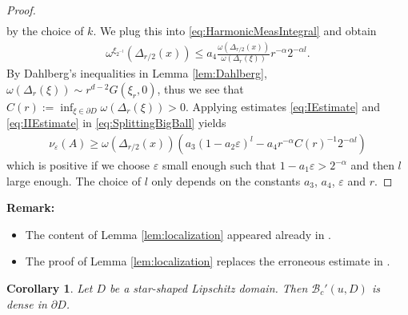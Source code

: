 \documentclass[a4paper,12pt]{article}
\newtheorem{corollary}{Corollary}[theorem]
\theoremstyle{definition}
\theoremstyle{definition}
\begin{document}
\begin{proof}
\begin{align*}
		\end{align*}
	 	by the choice of $k$. We plug this into \eqref{eq:HarmonicMeasIntegral} and obtain
		\begin{align}\label{eq:IIEstimate}
			\omega^{\xi_{2^{-l}}}(\Delta_{r/2}(x))\leq a_4\frac{\omega(\Delta_{r/2}(x))}{\omega(\Delta_r(\xi))}r^{-\alpha}2^{-\alpha l}.
		\end{align}
		By Dahlberg's inequalities in Lemma \ref{lem:Dahlberg}, $\omega(\Delta_r(\xi))\sim r^{d-2}G(\xi_r,0)$, thus we see that $C(r):=\inf_{\xi\in\partial D}\omega(\Delta_r(\xi))>0$. Applying estimates \eqref{eq:IEstimate} and \eqref{eq:IIEstimate} in \eqref{eq:SplittingBigBall} yields
		\begin{align*}
			\nu_{\varepsilon}(A)\geq \omega(\Delta_{r/2}(x))\left(a_3(1-a_2\varepsilon)^l-a_4r^{-\alpha}C(r)^{-1}2^{-\alpha l}\right)
		\end{align*}
		which is positive if we choose $\varepsilon$ small enough such that $1-a_1\varepsilon>2^{-\alpha}$ and then $l$ large enough. The choice of $l$ only depends on the constants $a_3$, $a_4$, $\varepsilon$ and $r$.
	\end{proof}
	\noindent\textbf{Remark:}
	\begin{itemize}
		\item The content of Lemma \ref{lem:localization} appeared already in \cite[Lemma 3.33(2)]{FMR25}. 
		\item The proof of Lemma \ref{lem:localization} replaces the erroneous estimate in \cite[p.55,line 5]{FMR25}.
	\end{itemize}
	\begin{corollary}
		Let $D$ be a star-shaped Lipschitz domain. Then $\mathcal{B}_c'(u,D)$ is dense in $\partial D$.
	\end{corollary}
\end{document}
